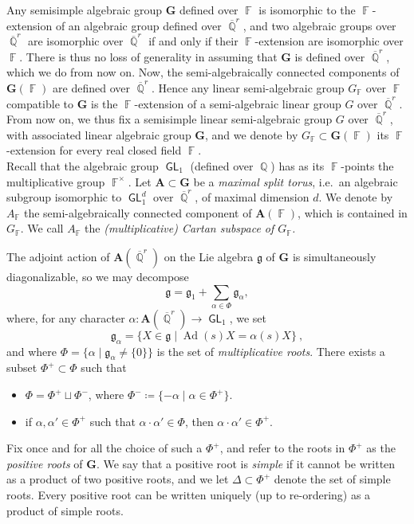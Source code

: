 \documentclass{amsart}
\theoremstyle{plain}
\theoremstyle{definition}
\DeclareMathOperator{\GL}{\mathsf{GL}}
\DeclareMathOperator{\Ad}{Ad}
\DeclareMathOperator{\Fb}{{\mathbb{F}}}
\DeclareMathOperator{\Qb}{\mathbb{Q}}
\newcommand{\Qbar}{\overline{\Qb}^r}
\newcommand{\1}{\mathbf{1}}
\begin{document}
Any semisimple algebraic group $\mathbf{G}$ defined over $\Fb$ is isomorphic to the $\Fb$-extension of an algebraic group defined over $\overline{\Qb}^r$, and two algebraic groups over $\overline{\Qb}^r$ are isomorphic over $\overline{\Qb}^r$ if and only if their $\Fb$-extension are isomorphic over $\Fb$. There is thus no loss of generality in assuming that $\mathbf G$ is defined over $\overline{\Qb}^r$, which we do from now on. Now, the semi-algebraically connected components of $\mathbf G(\Fb)$ are defined over $\overline{\Qb}^r$. Hence any linear semi-algebraic group $G_{\Fb}$ over $\Fb$ compatible to $\mathbf G$ is the $\Fb$-extension of a semi-algebraic linear group $G$ over $\overline{\Qb}^r$. From now on, we thus fix a semisimple linear semi-algebraic group $G$ over $\overline{\Qb}^r$, with associated linear algebraic group $\mathbf G$, and we denote by $G_{\Fb} \subset \mathbf G(\Fb)$ its $\Fb$-extension for every real closed field $\Fb$.\\

Recall that the algebraic group $\GL_1$ (defined over $\Qb$) has as its $\Fb$-points the multiplicative group $\Fb^\times$. Let $\mathbf A \subset \mathbf G$ be a \emph{maximal split torus}, i.e.\ an algebraic subgroup isomorphic to $\GL_1^d$ over $\Qbar$, of maximal dimension $d$.
We denote by $A_{\Fb}$ the semi-algebraically connected component of $\mathbf A(\Fb)$, which is contained in $G_{\Fb}$. We call $A_{\Fb}$ the \emph{(multiplicative) Cartan subspace of $G_{\Fb}$.}

The adjoint action of $\mathbf A(\overline{\Qb}^r)$ on the Lie algebra $\mathfrak g$ of $\mathbf G$ is simultaneously diagonalizable, so we may decompose
\[\mathfrak g=\mathfrak g_1+\sum_{\alpha\in\Phi}\mathfrak g_\alpha,\]
where, for any character $\alpha \colon \mathbf A(\overline{\Qb}^r) \to \GL_1$, we set \[\mathfrak g_\alpha=\{X\in\mathfrak g \mid \Ad(s)X=\alpha(s)X\}~,\] and where $\Phi = \{\alpha \mid \mathfrak{g}_{\alpha} \neq \{0\} \}$ is the set of \emph{multiplicative roots}. There exists a subset $\Phi^+\subset\Phi$ such that 
\begin{itemize}
    \item $\Phi=\Phi^+\sqcup\Phi^-$, where $\Phi^-\coloneqq \{-\alpha \mid \alpha\in\Phi^+\}$.
\item if $\alpha,\alpha'\in\Phi^+$ such that $\alpha\cdot\alpha'\in\Phi$, then $\alpha\cdot\alpha'\in\Phi^+$.
\end{itemize}
Fix once and for all the choice of such a $\Phi^+$, and refer to the roots in $\Phi^+$ as the \emph{positive roots} of $\mathbf G$. We say that a positive root is \emph{simple} if it cannot be written as a product of two positive roots, and we let $\Delta\subset\Phi^+$ denote the set of simple roots. Every positive root can be written uniquely (up to re-ordering) as a product of simple roots. 
\end{document}
